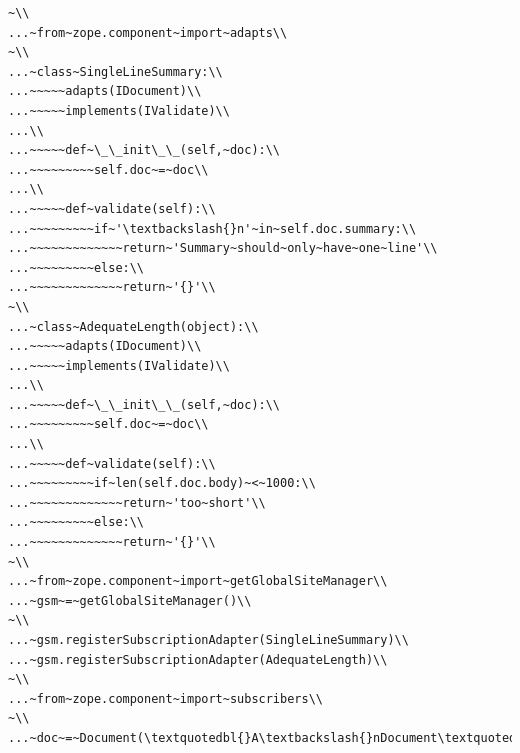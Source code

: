 \documentclass[a4paper,openany,twoside,draft]{book}
\begin{document}
\begin{verbatim}
~\\
...~from~zope.component~import~adapts\\
~\\
...~class~SingleLineSummary:\\
...~~~~~adapts(IDocument)\\
...~~~~~implements(IValidate)\\
...\\
...~~~~~def~\_\_init\_\_(self,~doc):\\
...~~~~~~~~~self.doc~=~doc\\
...\\
...~~~~~def~validate(self):\\
...~~~~~~~~~if~'\textbackslash{}n'~in~self.doc.summary:\\
...~~~~~~~~~~~~~return~'Summary~should~only~have~one~line'\\
...~~~~~~~~~else:\\
...~~~~~~~~~~~~~return~'{}'\\
~\\
...~class~AdequateLength(object):\\
...~~~~~adapts(IDocument)\\
...~~~~~implements(IValidate)\\
...\\
...~~~~~def~\_\_init\_\_(self,~doc):\\
...~~~~~~~~~self.doc~=~doc\\
...\\
...~~~~~def~validate(self):\\
...~~~~~~~~~if~len(self.doc.body)~<~1000:\\
...~~~~~~~~~~~~~return~'too~short'\\
...~~~~~~~~~else:\\
...~~~~~~~~~~~~~return~'{}'\\
~\\
...~from~zope.component~import~getGlobalSiteManager\\
...~gsm~=~getGlobalSiteManager()\\
~\\
...~gsm.registerSubscriptionAdapter(SingleLineSummary)\\
...~gsm.registerSubscriptionAdapter(AdequateLength)\\
~\\
...~from~zope.component~import~subscribers\\
~\\
...~doc~=~Document(\textquotedbl{}A\textbackslash{}nDocument\textquotedbl{},~\textquotedbl{}blah\textquotedbl{})\\

\end{verbatim}
\end{document}
